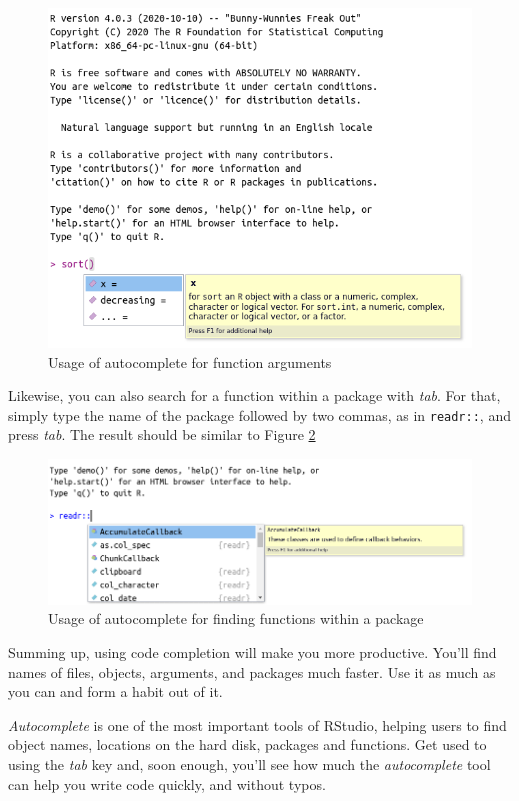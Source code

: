\documentclass[
  12pt,
]{book}
\newenvironment{rmdimportant}
{\begin{importantblock}
		
	} {\end{importantblock}}
\begin{document}
\begin{figure}[!htbp]

{\centering \includegraphics[width=0.75\linewidth]{figs/autocomplete_args} 

}

\caption{Usage of autocomplete for function arguments}\label{fig:autocomplete-args}
\end{figure}

Likewise, you can also search for a function within a package with \emph{tab}. For that, simply type the name of the package followed by two commas, as in \texttt{readr::}, and press \emph{tab}. The result should be similar to Figure \ref{fig:autocomplete-pkg-fct}

\begin{figure}[!htbp]

{\centering \includegraphics[width=0.75\linewidth]{figs/autocomplete_pkg_fcts} 

}

\caption{Usage of autocomplete for finding functions within a package}\label{fig:autocomplete-pkg-fct}
\end{figure}

Summing up, using code completion will make you more productive. You'll find names of files, objects, arguments, and packages much faster. Use it as much as you can and form a habit out of it.

\begin{rmdimportant}
\emph{Autocomplete} is one of the most important tools of RStudio,
helping users to find object names, locations on the hard disk, packages
and functions. Get used to using the \emph{tab} key and, soon enough,
you'll see how much the \emph{autocomplete} tool can help you write code
quickly, and without typos.
\end{rmdimportant}
\end{document}
